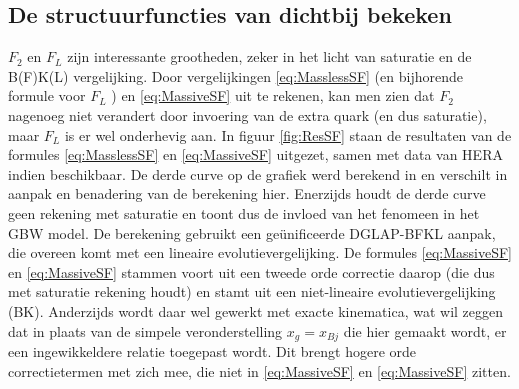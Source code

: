 \documentclass[a4paper,11pt]{article}
\numberwithin{equation}{section} %
\begin{document}
    \subsection{De structuurfuncties van dichtbij bekeken} \label{sec:ResSF}
$F_2$ en $F_L$ zijn interessante grootheden, zeker in het licht van saturatie en de B(F)K(L) vergelijking.
Door vergelijkingen \eqref{eq:MasslessSF} (en bijhorende formule voor $F_L$ \cite[sectie 9.5.4]{Barone}) en \eqref{eq:MassiveSF} uit te rekenen, kan men zien dat $F_2$ nagenoeg niet verandert door invoering van de extra quark (en dus saturatie), maar $F_L$ is er wel onderhevig aan.
In figuur \ref{fig:ResSF} staan de resultaten van de formules \eqref{eq:MasslessSF} en \eqref{eq:MassiveSF} uitgezet, samen met data van HERA \cite{H1} \cite{ZEUS} indien beschikbaar.
De derde curve op de grafiek werd berekend in \cite{Stasto} en verschilt in aanpak en benadering van de berekening hier.
Enerzijds houdt de derde curve geen rekening met saturatie en toont dus de invloed van het fenomeen in het GBW model.
De berekening gebruikt een geünificeerde DGLAP-BFKL aanpak, die overeen komt met een lineaire evolutievergelijking.
De formules \eqref{eq:MassiveSF} en \eqref{eq:MassiveSF} stammen voort uit een tweede orde correctie daarop (die dus met saturatie rekening houdt) en stamt uit een niet-lineaire evolutievergelijking (BK).
Anderzijds wordt daar wel gewerkt met exacte kinematica, wat wil zeggen dat in plaats van de simpele veronderstelling $x_g=x_{Bj}$ die hier gemaakt wordt, er een ingewikkeldere relatie toegepast wordt.
Dit brengt hogere orde correctietermen met zich mee, die niet in \eqref{eq:MassiveSF} en \eqref{eq:MassiveSF} zitten.
\end{document}
